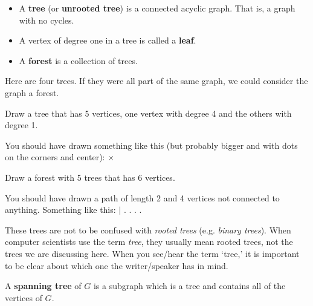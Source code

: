 \begin{df}
\begin{itemize}
\item
A {\bf tree} (or {\bf unrooted tree}) is a connected acyclic graph.
That is, a graph with no cycles.
\item
A vertex of degree one in a tree is called a {\bf leaf}.
\item
A {\bf forest} is a collection of trees.
\end{itemize}
\end{df}

\begin{exa}
Here are four trees.  If they were all part of the same graph, we could consider
the graph a forest.
\begin{center}
\end{center}
\end{exa}


\begin{exer}
Draw a tree that has 5 vertices, one vertex with degree 4 and the others with degree 1.

\vspace*{.5in}
\begin{answer}
You should have drawn something like this (but probably bigger and with dots on the corners 
and center): $\times$
\end{answer}
\end{exer}


\begin{exer}
Draw a forest with 5 trees that has 6 vertices.

\vspace*{.5in}
\begin{answer}
You should have drawn a path of length 2 and 4 vertices not connected to anything. Something like this:
 $|$ . . . .
\end{answer}
\end{exer}


\begin{rem}
These trees are not to be confused with {\em rooted trees} (e.g. {\em binary trees}).
When computer scientists use the term {\em tree}, they usually mean rooted trees,
not the trees we are discussing here.  When you see/hear the term `tree,' it is
important to be clear about which one the writer/speaker has in mind.
\end{rem}


\begin{df}
A {\bf spanning tree} of $G$ is a subgraph which is a tree and
contains all of the vertices of $G$.
\end{df}

